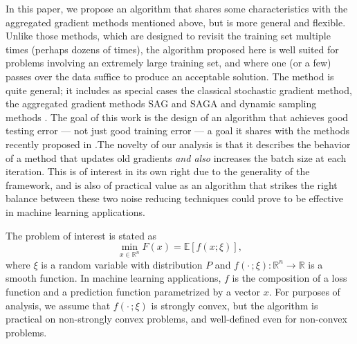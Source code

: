 \documentclass[11pt]{article}
\begin{document}
In this paper, we propose an algorithm that shares some characteristics with the aggregated gradient methods mentioned above, but is more general and flexible. Unlike those methods, which are designed to revisit the training set multiple times (perhaps dozens of times), the algorithm proposed here is well suited for problems involving an extremely large training set, and where one (or a few) passes over the data suffice to produce an acceptable solution. The method is quite general; it includes as special cases  the classical stochastic gradient method, the aggregated gradient methods SAG \cite{NIPS2014_5258} and SAGA \cite{NIPS2014_5258} and  dynamic sampling methods \cite{dss,FS2011,2014pasglyetal}. The goal  of this work is the design of an algorithm that achieves good testing error --- not just good training error --- a goal it shares with the methods recently proposed in \cite{frostig2014competing,babanezhad2015stop}.The  novelty of our analysis is that it describes the behavior of a method that updates 
old gradients \emph{and also}  increases the batch size at each iteration. This is of interest in its own right due to the generality of the framework, and is also of practical value as an algorithm that strikes the right balance between these two noise reducing techniques could prove to be  effective in machine learning applications.


The problem of interest is stated as
\begin{equation}  \label{risk}
	\min_{x \in \mathbb{R}^n} F(x) = \mathbb{E}[ f(x;\xi)] ,
\end{equation}
where $\xi$ is a random variable with distribution $P$ and $f(\cdot\,; \xi): \mathbb{R}^n \rightarrow \mathbb{R}$  is a smooth function. In machine learning applications, $f$ is the composition of a  loss function and a prediction function parametrized by a vector $x$. 
For purposes of analysis, we assume that $f(\cdot\,; \xi)$ is strongly convex, but the algorithm is practical on non-strongly convex problems, and well-defined even for non-convex problems. 
\end{document}
